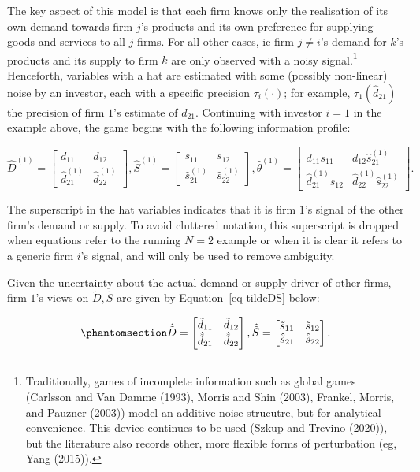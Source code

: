 \documentclass[
]{article}
\theoremstyle{plain}
\theoremstyle{definition}
\theoremstyle{remark}
\begin{document}
The key aspect of this model is that each firm knows only the
realisation of its own demand towards firm \(j\)'s products and its own
preference for supplying goods and services to all \(j\) firms. For all
other cases, ie firm \(j \neq i\)'s demand for \(k\)'s products and its
supply to firm \(k\) are only observed with a noisy signal.\footnote{Traditionally,
  games of incomplete information such as global games (Carlsson and Van
  Damme (1993), Morris and Shin (2003), Frankel, Morris, and Pauzner
  (2003)) model an additive noise strucutre, but for analytical
  convenience. This device continues to be used (Szkup and Trevino
  (2020)), but the literature also records other, more flexible forms of
  perturbation (eg, Yang (2015)).} Henceforth, variables with a hat are
estimated with some (possibly non-linear) noise by an investor, each
with a specific precision \(\tau_i(\cdot)\); for example,
\(\tau_1(\hat{d}_{21})\) the precision of firm \(1\)'s estimate of
\(d_{21}\). Continuing with investor \(i=1\) in the example above, the
game begins with the following information profile:

\[
\hat{D}^{(1)} = 
\begin{bmatrix}
d_{11} & d_{12} \\
\hat{d}_{21}^{(1)} & \hat{d}_{22}^{(1)}
\end{bmatrix}
,
\hat{S}^{(1)} = 
\begin{bmatrix}
s_{11} & s_{12} \\
\hat{s}_{21}^{(1)} & \hat{s}_{22}^{(1)}
\end{bmatrix}
,
\hat{\theta}^{(1)} = 
\begin{bmatrix}
d_{11}s_{11} & d_{12}\hat{s}_{21}^{(1)} \\
\hat{d}_{21}^{(1)} s_{12} & \hat{d}_{22}^{(1)} \hat{s}_{22}^{(1)}
\end{bmatrix}.
\]

The superscript in the hat variables indicates that it is firm \(1\)'s
signal of the other firm's demand or supply. To avoid cluttered
notation, this superscript is dropped when equations refer to the
running \(N=2\) example or when it is clear it refers to a generic firm
\(i\)'s signal, and will only be used to remove ambiguity.

Given the uncertainty about the actual demand or supply driver of other
firms, firm \(1\)'s views on \(\tilde{D}, \tilde{S}\) are given by
Equation~\ref{eq-tildeDS} below:

\begin{equation}\phantomsection\label{eq-tildeDS}{
\hat{\tilde{D}} = 
\begin{bmatrix}
\tilde{d}_{11} & \tilde{d}_{12} \\
\hat{\tilde{d}}_{21} & \hat{\tilde{d}}_{22}
\end{bmatrix}
,
\hat{\tilde{S}} = 
\begin{bmatrix}
\tilde{s}_{11} & \tilde{s}_{12} \\
\hat{\tilde{s}}_{21} & \hat{\tilde{s}}_{22}
\end{bmatrix}.
}\end{equation}
\end{document}
